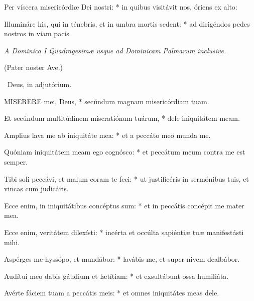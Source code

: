 Per víscera misericórdiæ Dei nostri: * in quibus visitávit nos, óriens ex alto:

Illumináre his, qui in ténebris, et in umbra mortis sedent: * ad dirigéndos pedes nostros in viam pacis.





\textit{A Dominica I Quadragesimæ usque ad Dominicam Palmarum inclusive.}

(Pater noster  Ave.)

\V\ Deus, in adjutórium.



\lettrine[lines=2]{M}{ISERERE} mei, Deus, * secúndum magnam misericórdiam tuam.

Et secúndum multitúdinem miseratiónum tuárum, * dele iniquitátem meam.

Amplius lava me ab iniquitáte mea: * et a peccáto meo munda me.

Quóniam iniquitátem meam ego cognósco: * et peccátum meum contra me est semper.

Tibi soli peccávi, et malum coram te feci: * ut justificéris in sermónibus tuis, et vincas cum judicáris.

Ecce enim, in iniquitátibus concéptus sum: * et in peccátis concépit me mater mea.

Ecce enim, veritátem dilexísti: * incérta et occúlta sapiéntiæ tuæ manifestásti mihi.

Aspérges me hyssópo, et mundábor: * lavábis me, et super nivem dealbábor.

Audítui meo dabis gáudium et lætítiam: * et exsultábunt ossa humiliáta.

Avérte fáciem tuam a peccátis meis: * et omnes iniquitátes meas dele.

